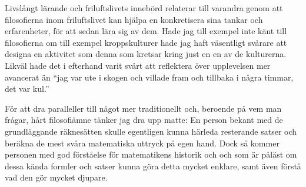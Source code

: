 \documentclass[12pt]{article}   %
\begin{document}
Livslångt lärande och friluftslivets innebörd relaterar till varandra genom att filosofierna
inom friluftslivet kan hjälpa en konkretisera sina tankar och erfarenheter, för att sedan
lära sig av dem. Hade jag till exempel inte känt till filosofierna om till exempel kroppskulturer
hade jag haft väsentligt svårare att designa en aktivitet som denna som kretsar
kring just en en av de kulturerna. Likväl hade det i efterhand varit svårt att
reflektera över upplevelsen mer avancerat än ``jag var ute i skogen och villade fram
och tillbaka i några timmar, det var kul.''

För att dra paralleller till något mer traditionellt och, beroende på vem man frågar, hårt
filosofiämne tänker jag dra upp matte: En person bekant med de grundläggande räknesätten
skulle egentligen kunna härleda resterande satser och beräkna de mest svåra matematiska
uttryck på egen hand. Dock så kommer personen med god förståelse för matematikens historik och
och som är påläst om dessa kända formler och satser kunna göra detta mycket enklare, samt
även förstå vad den gör mycket djupare.

\pagebreak

\renewcommand{\refname}{Källor}


\end{document}
